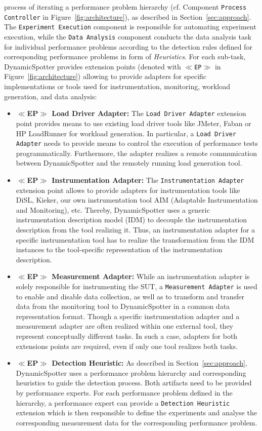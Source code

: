 \documentclass{report}
\newcommand{\DS}{DynamicSpotter }
\begin{document}
process of iterating a performance problem hierarchy (cf. Component \texttt{Process Controller} in
Figure~\ref{fig:architecture}), as described in Section~\ref{sec:approach}.
The \texttt{Experiment Execution} component is responsible for automating experiment execution, while the \texttt{Data
Analysis} component conducts the data analysis task for individual performance problems according to the detection rules
defined for corresponding performance problems in form of \emph{Heuristics}.
For each sub-task, \DS provides extension points (denoted with \texttt{\(\ll\)EP\(\gg\)} in Figure~\ref{fig:architecture})
allowing to provide adapters for specific implementations or tools used for instrumentation, monitoring, workload
generation, and data analysis:

\begin{itemize}
  \item \textbf{\(\ll\)EP\(\gg\) Load Driver Adapter:} The \texttt{Load Driver Adapter}
  extension point provides means to use existing load driver tools like JMeter, Faban or HP LoadRunner for workload generation.
  In particular, a \texttt{Load Driver Adapter} needs to provide means to control the execution of performance tests
  programmatically. Furthermore, the adapter realizes a remote communication between \DS and the remotely running load
  generation tool.
  \item \textbf{\(\ll\)EP\(\gg\) Instrumentation Adapter:} The \texttt{Instrumentation Adapter} extension point allows
  to provide adapters for instrumentation tools like DiSL, Kieker, our own instrumentation tool AIM (Adaptable Instrumentation and
Monitoring), etc. Thereby, \DS uses a generic instrumentation description model (IDM) to decouple the instrumentation
description from the tool realizing it. Thus, an instrumentation adapter for a specific instrumentation tool has to
realize the transformation from the IDM instances to the tool-specific representation of the instrumentation
description.
  \item \textbf{\(\ll\)EP\(\gg\) Measurement Adapter:} While an instrumentation adapter is solely responsible for
  instrumenting the SUT, a \texttt{Measurement Adapter} is used to enable and disable data collection, as well as to
  transform and transfer data from the monitoring tool to \DS in a common data representation format. Though a
  specific instrumentation adapter and a measurement adapter are often realized within one external tool, they represent
  conceptually different tasks. In such a case, adapters for both extensions points are required, even if only one tool
  realizes both tasks. 
  \item \textbf{\(\ll\)EP\(\gg\) Detection Heuristic:} As described in Section~\ref{sec:approach}, \DS uses a
  performance problem hierarchy and corresponding heuristics to guide the detection process. Both artifacts need to be
  provided by performance experts. For each performance problem defined in the hierarchy, a performance expert can
  provide a \texttt{Detection Heuristic} extension which is then responsible to define the experiments and analyse the
  corresponding measurement data for the corresponding performance problem. 
\end{itemize}
\end{document}

